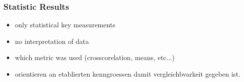 \subsubsection{Statistic Results}

\begin{itemize}
	\item only statistical key measurements
	\item no interpretation of data
	\item which metric was used (crosscorelation, means, etc...)
	\item orientieren an etablierten kenngroessen damit vergleichbvarkeit gegeben ist.
\end{itemize}